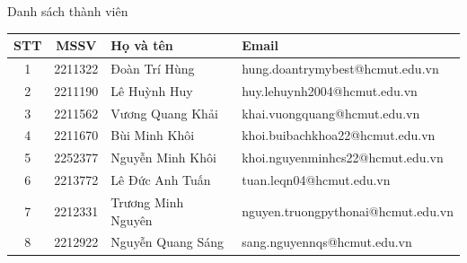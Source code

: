 \begin{frame}{Danh sách thành viên}
  \centering
  \footnotesize
  \renewcommand{\arraystretch}{1.35}

  \begin{tabular}{c c p{} p{}}
    \toprule
    \rowcolor{blue!20}
    \textbf{STT} & \textbf{MSSV} & \centering\arraybackslash\textbf{Họ và tên} & \centering\arraybackslash\textbf{Email} \\
    \midrule
    1 & 2211322 & Đoàn Trí Hùng & \ttfamily\scriptsize hung.doantrymybest@hcmut.edu.vn \\
    2 & 2211190 & Lê Huỳnh Huy & \ttfamily\scriptsize huy.lehuynh2004@hcmut.edu.vn \\
    3 & 2211562 & Vương Quang Khải & \ttfamily\scriptsize khai.vuongquang@hcmut.edu.vn \\
    4 & 2211670 & Bùi Minh Khôi & \ttfamily\scriptsize khoi.buibachkhoa22@hcmut.edu.vn \\
    5 & 2252377 & Nguyễn Minh Khôi & \ttfamily\scriptsize khoi.nguyenminhcs22@hcmut.edu.vn \\
    6 & 2213772 & Lê Đức Anh Tuấn & \ttfamily\scriptsize tuan.leqn04@hcmut.edu.vn \\
    7 & 2212331 & Trương Minh Nguyên & \ttfamily\scriptsize nguyen.truongpythonai@hcmut.edu.vn \\
    8 & 2212922 & Nguyễn Quang Sáng & \ttfamily\scriptsize sang.nguyennqs@hcmut.edu.vn \\
    \bottomrule
  \end{tabular}
\end{frame}
